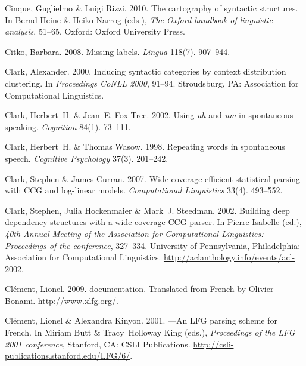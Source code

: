 \begin{thebibliography}{1420}
Cinque, Guglielmo \& Luigi Rizzi. 2010.
\newblock The cartography of syntactic structures.
\newblock In Bernd Heine \& Heiko Narrog (eds.), \emph{The {Oxford} handbook of
  linguistic analysis}, 51--65. Oxford: Oxford University Press.

Citko, Barbara. 2008.
\newblock Missing labels.
\newblock \emph{Lingua} 118(7). 907--944.

Clark, Alexander. 2000.
\newblock Inducing syntactic categories by context distribution clustering.
\newblock In \emph{Proceedings {CoNLL 2000}}, 91--94. Stroudsburg, PA:
  Association for Computational Linguistics.

Clark, Herbert~H. \& Jean~E. {Fox Tree}. 2002.
\newblock Using \emph{uh} and \emph{um} in spontaneous speaking.
\newblock \emph{Cognition} 84(1). 73--111.

Clark, Herbert~H. \& Thomas Wasow. 1998.
\newblock Repeating words in spontaneous speech.
\newblock \emph{Cognitive Psychology} 37(3). 201--242.

Clark, Stephen \& James Curran. 2007.
\newblock Wide-coverage efficient statistical parsing with {CCG} and log-linear
  models.
\newblock \emph{Computational Linguistics} 33(4). 493--552.

Clark, Stephen, Julia Hockenmaier \& Mark~J. Steedman. 2002.
\newblock Building deep dependency structures with a wide-coverage {CCG}
  parser.
\newblock In Pierre Isabelle (ed.), \emph{{40th Annual Meeting of the
  Association for Computational Linguistics}: {Proceedings} of the conference},
  327--334. University of Pennsylvania, Philadelphia: Association for
  Computational Linguistics.
\newblock \urlprefix\url{http://aclanthology.info/events/acl-2002}.

Cl\'{e}ment, Lionel. 2009.
 documentation.
\newblock Translated from French by Olivier Bonami.
\newblock \urlprefix\url{http://www.xlfg.org/}.

Cl\'{e}ment, Lionel \& Alexandra Kinyon. 2001.
---{An} {LFG} parsing scheme for {French}.
\newblock In Miriam Butt \& Tracy~Holloway King (eds.), \emph{Proceedings of
  the {LFG 2001} conference}, Stanford, CA: CSLI Publications.
\newblock \urlprefix\url{http://csli-publications.stanford.edu/LFG/6/}.


\end{thebibliography}
